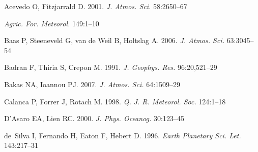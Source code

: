 \documentclass{ar-1col}
\begin{document}
\begin{thebibliography}{00}

Acevedo O, Fitzjarrald D. 2001.
\textit{J. Atmos. Sci.} 58:2650--67

\textit{Agric. For. Meteorol.} 149:1--10

Baas P, Steeneveld G, {van de Weil} B, Holtslag A. 2006.
\textit{J. Atmos. Sci.} 63:3045--54

Badran F, Thiria S, Crepon M. 1991.
\textit{J. Geophys. Res.} 96:20,521--29

Bakas NA, Ioannou PJ. 2007.
\textit{J. Atmos. Sci.} 64:1509--29

Calanca P, Forrer J, Rotach M. 1998.
\textit{Q. J. R. Meteorol. Soc.} 124:1--18

D'Asaro EA, Lien RC. 2000.
\textit{J. Phys. Oceanog.} 30:123--45

de~Silva I, Fernando H, Eaton F, Hebert D. 1996.
\textit{Earth Planetary Sci. Let.} 143:217--31


\end{thebibliography}
\end{document}
